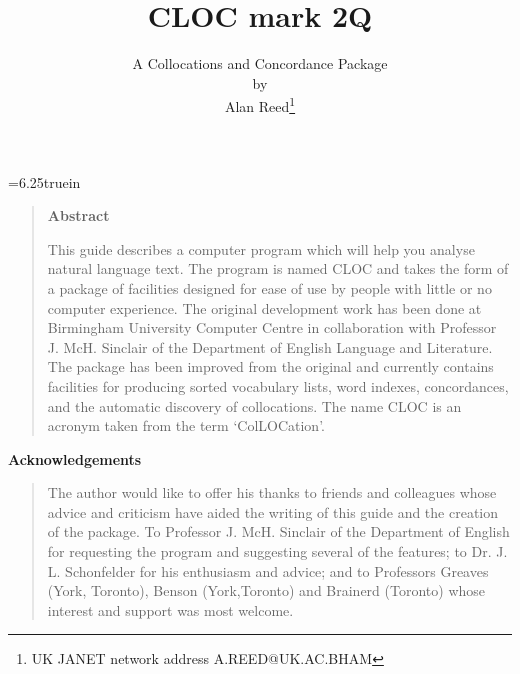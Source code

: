 %
\oddsidemargin=0in
\evensidemargin=0in
\textwidth=6.25truein          %

\headheight=0pt
\headsep=0pt
\topmargin=0in
\textheight=9.7in              %

\sloppy

\title{CLOC mark 2Q}
\author{A Collocations and Concordance Package\\by\\
        Alan Reed\thanks{UK JANET network address A.REED@UK.AC.BHAM}}
\maketitle

\begin{quote}
\begin{center}
{\bf Abstract}
\end{center}

This guide describes a computer program which will help you analyse
natural language text.
The program is named CLOC and takes the form of a
package of facilities designed for ease of use by people with little or
no computer experience.
The original development work has been done at Birmingham University
Computer Centre in collaboration with Professor J. McH. Sinclair of the
Department of English Language and Literature.
The package has been improved from the original and currently contains
facilities for producing sorted vocabulary lists, word indexes, concordances,
and the automatic discovery of collocations.
The name CLOC is an acronym taken from the term `ColLOCation'.
\end{quote}

\begin{center}
{\bf Acknowledgements}
\end{center}
\begin{quote}
The author would like to offer his thanks to friends and
colleagues whose advice and criticism have aided the writing of this
guide and the creation of the package.
To Professor J. McH. Sinclair of the Department of English for requesting
the program and suggesting several of the features; to Dr. J. L. Schonfelder
for his enthusiasm and advice; and to Professors Greaves (York, Toronto),
Benson (York,Toronto) and Brainerd (Toronto) whose interest and support
was most welcome.
\end{quote}
\newpage

